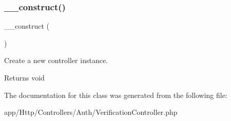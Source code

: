 \subsubsection{\texorpdfstring{\_\_construct()}{\_\_construct()}}
{\footnotesize\ttfamily \+\_\+\+\_\+construct (\begin{DoxyParamCaption}{ }\end{DoxyParamCaption})}

Create a new controller instance.

\begin{DoxyReturn}{Returns}
void 
\end{DoxyReturn}


The documentation for this class was generated from the following file\+:\begin{DoxyCompactItemize}
\item 
app/\+Http/\+Controllers/\+Auth/Verification\+Controller.\+php\end{DoxyCompactItemize}
